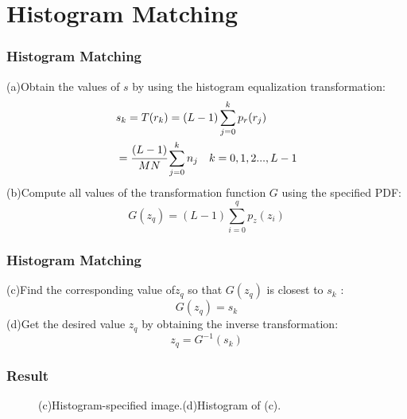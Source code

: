 \documentclass[notheorems,serif,table,compress]{beamer}  %
\begin{document}
\section{Histogram Matching}
\begin{frame}
\frametitle{Histogram Matching}
{\color{blue}(a)}Obtain the values of $s$ by using the histogram equalization transformation:
\begin{align} 
&s_k=T(r_k)=(L-1)\sum_{j=0}^k p_r(r_j)  \\
&=\cfrac{(L-1)}{MN}\sum_{j=0}^k n_j \quad k=0,1,2...,L-1\nonumber
\end{align}
{\color{blue}(b)}Compute all values of the transformation function $G$ using the specified PDF:
\begin{equation} 
G(z_q)=(L-1)\sum_{i=0}^q p_z(z_i) 
\end{equation}
\end{frame}
\begin{frame}
\frametitle{Histogram Matching}
{\color{blue}(c)}Find the corresponding value of$z_q$ so that $G(z_q)$ is closest to $s_k$ :
\begin{equation} 
G(z_q)=s_k
\end{equation}
{\color{blue}(d)}Get the desired value $z_q$ by obtaining the inverse transformation:
\begin{equation} 
z_q=G^{-1}(s_k)
\end{equation}
\end{frame}
\begin{frame}
\frametitle{Result}
\begin{figure}
\begin{center}
\end{center}
\caption{(a)Origin image.(b)Histogram of (a).}
\begin{center}
\end{center}
\caption{(c)Histogram-specified image.(d)Histogram of (c).}
\end{figure}
\end{frame}
\end{document}
